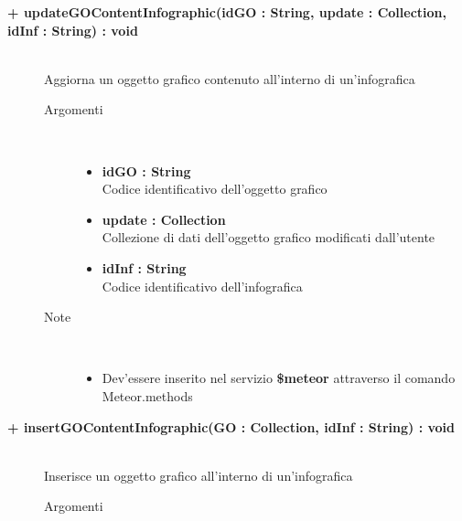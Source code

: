 \begin{description}
	\begin{description}
		\item[\textbf{\color{blue}+ updateGOContentInfographic(idGO : String, update : Collection, idInf : String) : void			}] \hfill \\
			Aggiorna un oggetto grafico contenuto all'interno di un'infografica
			
		\begin{description}
			\item[Argomenti] \hfill \\
				\begin{itemize}
				
					\item \textbf{idGO :  String			} \hfill \\
					Codice identificativo dell'oggetto grafico
					\item \textbf{update : Collection			} \hfill \\
					Collezione di dati dell'oggetto grafico modificati dall'utente
					\item \textbf{idInf :  String			} \hfill \\
					Codice identificativo dell'infografica
					
				\end{itemize}
			\item[Note] \hfill \\
			\begin{itemize}
					\item Dev'essere inserito nel servizio \textbf{\$meteor} attraverso il comando Meteor.methods
				\end{itemize}
		\end{description}
	\end{description}
	
	\begin{description}
		\item[\textbf{\color{blue}+ insertGOContentInfographic(GO : Collection, idInf : String) : void			}] \hfill \\
			Inserisce un oggetto grafico all'interno di un'infografica
			
		\begin{description}
			\item[Argomenti] \hfill \\
				\begin{itemize}
				

\end{itemize}
\end{description}
\end{description}
\end{description}
